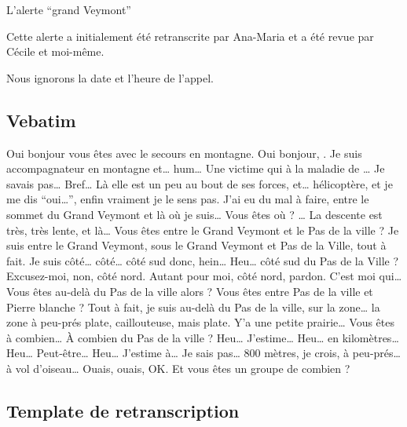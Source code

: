 L'alerte \enquote{grand Veymont}



Cette alerte a initialement été retranscrite par Ana-Maria
 et a été revue par Cécile  et
moi-même.

Nous ignorons la date et l'heure de l'appel.

\subsection{Vebatim}


\begin{dialogue}
  \Sec Oui bonjour vous êtes avec le secours en montagne.
  \Req Oui bonjour, . Je suis accompagnateur en
  montagne et… hum… Une victime qui à la maladie de
  … Je savais pas… Bref… Là elle est un peu au bout de
  ses forces, et…  hélicoptère, et je me dis
  \enquote{oui…}, enfin vraiment je le sens pas. J'ai eu du mal à
  faire, entre le sommet du Grand Veymont et là où je suis…
  \Sec {} Vous êtes où ?
  \Req … La descente est très, très lente, et là…
  \Sec Vous êtes entre le Grand Veymont et le Pas de la ville ?
  \Req Je suis entre le Grand Veymont, sous le Grand Veymont et Pas de
  la Ville, tout à fait. Je suis côté… côté… côté sud donc, hein…
  \Sec Heu… côté sud du Pas de la Ville ?
  \Req Excusez-moi, non, côté nord. Autant pour moi, côté nord,
  pardon. C'est moi qui…
  \Sec Vous êtes au-delà du Pas de la ville alors ? Vous êtes entre
  Pas de la ville et Pierre blanche ?
  \Req Tout à fait, je suis au-delà du Pas de la ville, sur la zone…
  la zone à peu-prés plate, caillouteuse, mais plate. Y'a une petite
  prairie…
  \Sec Vous êtes à combien… À combien du Pas de la ville ?
  \Req Heu… J'estime… Heu… en kilomètres… Heu… Peut-être… Heu…
  J'estime à… Je sais pas… 800 mètres, je crois, à peu-prés… à vol
  d'oiseau…
  \Sec Ouais, ouais, OK. Et vous êtes un groupe de combien ?
\end{dialogue}


\subsection{Template de retranscription}

